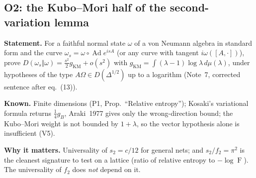 \documentclass[11pt]{article}
\theoremstyle{accent}
\theoremstyle{definition}
\newcommand{\Ad}{\operatorname{Ad}}
\newcommand{\Fid}{\operatorname{F}}
\begin{document}
\subsection{O2: the Kubo--Mori half of the second-variation lemma}\label{sec:O2}
\textbf{Statement.} For a faithful normal state \(\omega\) of a von Neumann algebra in standard form and the curve \(\omega_s=\omega\circ\Ad e^{isA}\) (or any curve with tangent \(i\omega([A,\cdot])\)), prove \(D(\omega_s\Vert\omega)=\frac{s^2}2g_{\mathrm{KM}}+o(s^2)\) with \(g_{\mathrm{KM}}=\int(\lambda-1)\log\lambda\,d\mu(\lambda)\), under hypotheses of the type \(A\Omega\in D(\Delta^{1/2})\) up to a logarithm (Note~7, corrected sentence after eq.~(13)).

\textbf{Known.} Finite dimensions (P1, Prop.~``Relative entropy''); Kosaki's variational formula returns \(\frac14g_B\), Araki~1977 gives only the wrong-direction bound; the Kubo--Mori weight is not bounded by \(1+\lambda\), so the vector hypothesis alone is insufficient (V5).

\textbf{Why it matters.} Universality of \(s_2=c/12\) for general nets; and \(s_2/f_2=\pi^2\) is the cleanest signature to test on a lattice (ratio of relative entropy to \(-\log\Fid\)).  The universality of \(f_2\) does \emph{not} depend on it.
\end{document}
